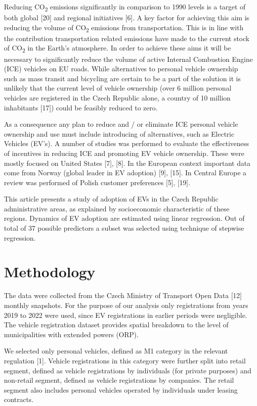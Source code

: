 \documentclass{mmeproc}
\begin{document}
Reducing CO\textsubscript{2} emissions significantly in comparison to
1990 levels is a target of both global {[}20{]} and regional initiatives
{[}6{]}. A key factor for achieving this aim is reducing the volume of
CO\textsubscript{2} emissions from transportation. This is in line with
the contribution transportation related emissions have made to the
current stock of CO\textsubscript{2} in the Earth's atmosphere. In order
to achieve these aims it will be necessary to significantly reduce the
volume of active Internal Combustion Engine (ICE) vehicles on EU roads.
While alternatives to personal vehicle ownership such as mass transit
and bicycling are certain to be a part of the solution it is unlikely
that the current level of vehicle ownership (over 6 million personal
vehicles are registered in the Czech Republic alone, a country of 10
million inhabitants {[}17{]}) could be feasibly reduced to zero.

As a consequence any plan to reduce and / or eliminate ICE personal
vehicle ownership and use must include introducing of alternatives, such
as Electric Vehicles (EV's). A number of studies was performed to
evaluate the effectiveness of incentives in reducing ICE and promoting
EV vehicle ownership. These were mostly focused on United States
{[}7{]}, {[}8{]}. In the European context important data come from
Norway (global leader in EV adoption) {[}9{]}, {[}15{]}. In Central
Europe a review was performed of Polish customer preferences {[}5{]},
{[}19{]}.

This article presents a study of adoption of EVs in the Czech Republic
administrative areas, as explained by socioeconomic characteristic of
these regions. Dynamics of EV adoption are estimated using linear
regression. Out of total of 37 possible predictors a subset was selected
using technique of stepwise regression.

\hypertarget{methodology}{%
\section{Methodology}\label{methodology}}

The data were collected from the Czech Ministry of Transport Open Data
{[}12{]} monthly snapshots. For the purpose of our analysis only
registrations from years 2019 to 2022 were used, since EV registrations
in earlier periods were negligible. The vehicle registration dataset
provides spatial breakdown to the level of municipalities with extended
powers (ORP).

We selected only personal vehicles, defined as M1 category in the
relevant regulation {[}1{]}. Vehicle registrations in this category
were further split into retail segment, defined as vehicle registrations
by individuals (for private purposes) and non-retail segment, defined as
vehicle registrations by companies. The retail segment also includes
personal vehicles operated by individuals under leasing contracts.
\end{document}
